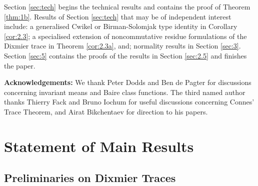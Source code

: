 \documentclass[final,1p]{elsarticle}
\numberwithin{equation}{section}
\theoremstyle{plain}
\theoremstyle{definition}
\begin{document}
Section \ref{sec:tech} begins the technical results and contains the proof of Theorem \ref{thm:1b}.  Results of Section \ref{sec:tech} that may be of independent interest include: a generalised Cwikel or Birman-Solomjak type identity in Corollary \ref{cor:2.3}; a specialised extension of noncommutative residue formulations of the Dixmier trace in Theorem \ref{cor:2.3a}, and; normality
results in Section \ref{sec:3}.
Section \ref{sec:5} contains the proofs of the results in Section \ref{sec:2.5} and finishes the paper.

\medskip \noindent \textbf{Acknowledgements:} We thank Peter Dodds and Ben de Pagter for discussions concerning invariant means and Baire class functions.  The third named author thanks Thierry Fack and Bruno Iochum for useful discussions concerning Connes' Trace Theorem, and Airat Bikchentaev for direction to his papers.

\section{Statement of Main Results} \label{sec:1}

\subsection{Preliminaries on Dixmier Traces} \label{sec:1.1}
\end{document}
